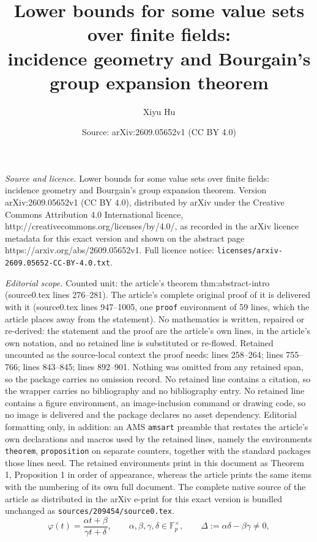 \documentclass[10pt,a4paper]{amsart}
\title{Lower bounds for some value sets over finite fields:\\ incidence geometry and Bourgain's group expansion theorem}
\author{Xiyu Hu}
\date{Source: arXiv:2609.05652v1 (CC BY 4.0)}
\newcommand{\F}{\mathbb F}
\begin{document}
\maketitle

\noindent\emph{Source and licence.} Lower bounds for some value sets over finite fields:\\ incidence geometry and Bourgain's group expansion theorem. Version arXiv:2609.05652v1 (CC BY 4.0), distributed by arXiv under the Creative Commons Attribution 4.0 International licence, http://creativecommons.org/licenses/by/4.0/, as recorded in the arXiv licence metadata for this exact version and shown on the abstract page https://arxiv.org/abs/2609.05652v1. Full licence notice: \texttt{licenses/arxiv-2609.05652-CC-BY-4.0.txt}.\par\smallskip

\noindent\textit{Editorial scope.} Counted unit: the article's theorem thm:abstract-intro (source0.tex lines 276--281). The article's complete original proof of it is delivered with it (source0.tex lines 947--1005, one \texttt{proof} environment of 59 lines, which the article places away from the statement). No mathematics is written, repaired or re-derived: the statement and the proof are the article's own lines, in the article's own notation, and no retained line is substituted or re-flowed.  Retained uncounted as the source-local context the proof needs: lines 258--264; lines 755--766; lines 843--845; lines 892--901.  Nothing was omitted from any retained span, so the package carries no omission record.  No retained line contains a citation, so the wrapper carries no bibliography and no bibliography entry.  No retained line contains a figure environment, an image-inclusion command or drawing code, so no image is delivered and the package declares no asset dependency.  Editorial formatting only, in addition: an AMS \texttt{amsart} preamble that restates the article's own declarations and macros used by the retained lines, namely the environments \texttt{theorem}, \texttt{proposition} on separate counters, together with the standard packages those lines need.  The retained environments print in this document as Theorem 1, Proposition 1 in order of appearance, whereas the article prints the same items with the numbering of its own full document.  The complete native source of the article as distributed in the arXiv e-print for this exact version is bundled unchanged as \texttt{sources/209454/source0.tex}.
\begin{equation}\label{eq:phi-intro}
  \varphi(t)=\frac{\alpha t+\beta}{\gamma t+\delta},
  \qquad
  \alpha,\beta,\gamma,\delta\in\F_p^\times,
  \qquad
  \Delta:=\alpha\delta-\beta\gamma\ne0,
\end{equation}
\end{document}
